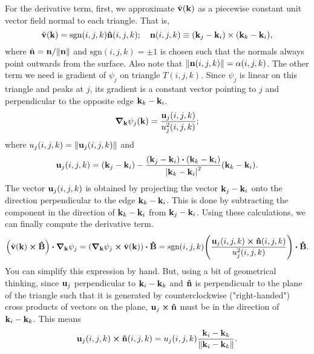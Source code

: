 \documentclass[12pt]{article}
\begin{document}
For the derivative term, first, we approximate $\hat{\vb{v}}(\vb{k})$ as a piecewise constant
unit vector field normal to each triangle. That is,
\begin{equation}
\hat{\vb{v}}(\vb{k}) = \text{sgn}(i,j,k) \vu{n}(i,j,k); \quad
\vb{n}(i,j,k) \equiv (\vb{k}_j - \vb{k}_i) \times (\vb{k}_k - \vb{k}_i),
\end{equation}
where $\hat{\vb{n}} = \vb{n}/\norm{\vb{n}}$ and $\text{sgn}(i,j,k) = \pm1$ is chosen such that
the normals always point outwards from the surface.
Also note that $\norm{\vb{n}(i,j,k)} = \alpha(i,j,k)$. The other term we need is gradient of
$\psi_j$ on triangle $T(i,j,k)$. Since $\psi_j$ is linear on this triangle and peaks at $j$,
its gradient is a constant vector pointing to $j$ and perpendicular to the opposite edge
$\vb{k}_k - \vb{k}_i$.
\begin{equation}
\grad_{\vb{k}} \psi_j(\vb{k}) = \frac{\vb{u}_j(i,j,k)}{u^2_j(i,j,k)};
\end{equation}
where $u_j(i,j,k) = \norm{\vb{u}_j(i,j,k)}$ and
\begin{equation}
\vb{u}_j(i,j,k) = (\vb{k}_j - \vb{k}_i)
- \frac{(\vb{k}_j-\vb{k}_i)\vdot(\vb{k}_k-\vb{k}_i)}{\abs{\vb{k}_k - \vb{k}_i}^2}
(\vb{k}_k - \vb{k}_i).
\end{equation}
The vector $\vb{u}_j(i,j,k)$ is obtained by projecting the vector $\vb{k}_j - \vb{k}_i$ onto the
direction perpendicular to the edge $\vb{k}_k - \vb{k}_i$. This is done by subtracting the component
in the direction of $\vb{k}_k - \vb{k}_i$ from $\vb{k}_j - \vb{k}_i$. Using these calculations, we
can finally compute the derivative term.
\begin{equation}
    \qty(\hat{\vb{v}}(\vb{k})\cross\vu{B})\vdot\grad_{\vb{k}}\psi_j
    = \qty(\grad_{\vb{k}}\psi_j\cross\hat{\vb{v}}(\vb{k}))\vdot\vu{B}
    = \text{sgn}(i,j,k)\qty(\frac{\vb{u}_j(i,j,k)\cross\vu{n}(i,j,k)}{u^2_j(i,j,k)})\vdot\vu{B}.
\end{equation}
You can simplify this expression by hand. But, using a bit of geometrical thinking, since $\vb{u}_j$
perpendicular to $\vb{k}_i - \vb{k}_k$ and $\vu{n}$ is perpendicualr to the plane of the triangle
such that it is generated by counterclockwise ("right-handed") cross products of vectors on the
plane, $\vb{u}_j\cross\vu{n}$ must be in the direction of $\vb{k}_i - \vb{k}_k$. This means
\begin{equation}
    \vb{u}_j(i,j,k)\cross\vu{n}(i,j,k) = u_j(i,j,k)
    \frac{\vb{k}_i-\vb{k}_k}{\norm{\vb{k}_i-\vb{k}_k}}.
\end{equation}
\end{document}
